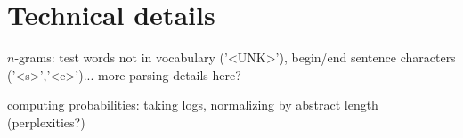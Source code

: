 \documentclass{article}
\begin{document}
\appendix
\section{Technical details} \label{app:details}
$n$-grams: test words not in vocabulary ('<UNK>'), begin/end sentence characters ('<s>','<e>')... more parsing details here?

computing probabilities: taking logs, normalizing by abstract length (perplexities?)






\nocite{*}



\end{document}
